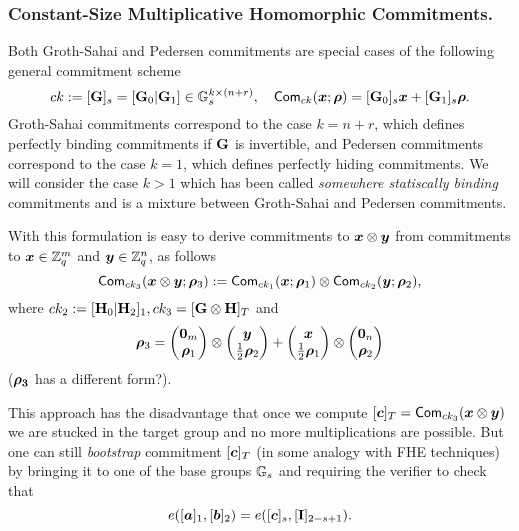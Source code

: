 \subsubsection{Constant-Size  Multiplicative Homomorphic Commitments.}
Both Groth-Sahai and Pedersen commitments are special cases of the following general commitment scheme
$$
ck:=[\mathbf{{G}}]_s=[\mathbf{{G}}_0|\mathbf{{G}}_1]\in\mathbb{G}_s^{k\times (n+r)}, \quad \mathsf{Com}_{ck}({\boldsymbol{x}};{\boldsymbol{\rho}})=[\mathbf{{G}}_0]_s{\boldsymbol{x}}+[\mathbf{{G}}_1]_s{\boldsymbol{\rho}}.
$$
Groth-Sahai commitments correspond to the case $k=n+r$, which defines perfectly binding commitments if $\mathbf{{G}}$ is invertible, and Pedersen commitments correspond to the case $k=1$, which defines perfectly hiding commitments. We will consider the case $k>1$ which has been called \emph{somewhere statiscally binding} commitments and is a mixture between Groth-Sahai and Pedersen commitments.

With this formulation is easy to derive commitments to ${\boldsymbol{x}}\otimes{\boldsymbol{y}}$ from commitments to ${\boldsymbol{x}}\in\mathbb{Z}_q^m$ and ${\boldsymbol{y}}\in\mathbb{Z}_q^n$, as follows
$$
\mathsf{Com}_{ck_3}({\boldsymbol{{\boldsymbol{x}}}}\otimes{\boldsymbol{y}};{\boldsymbol{\rho}}_3):=\mathsf{Com}_{ck_1}({\boldsymbol{x}};{\boldsymbol{\rho}}_1)\otimes\mathsf{Com}_{ck_2}({\boldsymbol{y}};{\boldsymbol{\rho}}_2),
$$
where $ck_2:=[\mathbf{{H}}_0|\mathbf{{H}}_2]_1,ck_3=[\mathbf{{G}}\otimes\mathbf{{H}}]_T$ and
$${\boldsymbol{\rho}}_3=\left(\begin{matrix}{\boldsymbol{0}}_m\\{\boldsymbol{\rho}}_1\end{matrix}\right)\otimes\left(\begin{matrix}{\boldsymbol{y}}\\\frac{1}{2}{\boldsymbol{\rho}}_2\end{matrix}\right)+\left(\begin{matrix}{\boldsymbol{x}}\\\frac{1}{2}{\boldsymbol{\rho}}_1\end{matrix}\right)\otimes\left(\begin{matrix}{\boldsymbol{0}}_n\\{\boldsymbol{\rho}}_2\end{matrix}\right)$$ (${\boldsymbol{\rho_3}}$ has a different form?).

This approach has the disadvantage that once we compute $[{\boldsymbol{c}}]_T=\mathsf{Com}_{ck_3}({\boldsymbol{x}}\otimes{\boldsymbol{y}})$ we are stucked in the target group and no more multiplications are possible. But one can still \emph{bootstrap} commitment $[{\boldsymbol{c}}]_T$ (in some analogy with FHE techniques)  by bringing it to one of the base groups $\mathbb{G}_s$ and requiring the verifier to check that
$$
e([{\boldsymbol{a}}]_1,[{\boldsymbol{b}}]_2)=e([{\boldsymbol{c}}]_s,[\mathbf{{I}}]_{2-s+1}).
$$
%
%

